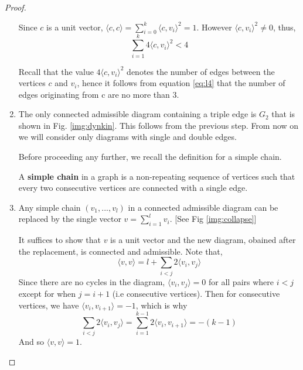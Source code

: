\begin{proof}
\begin{enumerate}
        Since $c$ is a unit vector, $\langle c, c \rangle = \sum_{i=0}^k \langle c, v_i \rangle^2 = 1$. However 
        $\langle c, v_i \rangle^2 \not= 0$, thus,
            \begin{equation}
                \label{eq:l4}
                \sum_{i=1}^k 4\langle c, v_i \rangle^2 < 4
            \end{equation}
            
        Recall that the value $4\langle c, v_i \rangle^2$ denotes the number of edges between the vertices $c$ and $v_i$, hence
        it follows from equation \ref{eq:l4} that the number of edges originating from c are no more than 3.
            
        \item The only connected admissible diagram containing a triple edge is $G_2$ that is shown in Fig. \ref{img:dynkin}.
        This follows from the previous step. From now on we will consider only diagrams with single and double edges.
        
        Before proceeding any further, we recall the definition for a simple chain.
        \begin{definition}
            A \textbf{simple chain} in a graph is a non-repeating sequence of vertices such that every two consecutive vertices are
            connected with a single edge.
        \end{definition}

        \item Any simple chain $(v_1, ..., v_l)$ in a connected admissible diagram can be replaced by the single vector 
        $v = \sum_{i=1}^l v_i$. [See Fig \ref{img:collapse}]

        It suffices to show that $v$ is a unit vector and the new diagram, obained after the replacement, is connected and admissible.
        Note that,
            \begin{equation*}
                \langle v, v \rangle = l + \sum_{i < j} 2 \langle v_i, v_j \rangle
            \end{equation*}
        Since there are no cycles in the diagram, $\langle v_i, v_j \rangle = 0$ for all pairs where $i < j$ except for when $j = i+1$
        (i.e consecutive vertices). Then for consecutive vertices, we have $\langle v_i, v_{i+1} \rangle = -1$, which is why 
        \begin{equation*}
            \sum_{i < j} 2 \langle v_i, v_j \rangle = \sum_{i  = 1}^{k-1} 2 \langle v_i, v_{i+1} \rangle = -(k-1)
        \end{equation*}
        And so $\langle v, v \rangle = 1$.


\end{enumerate}
\end{proof}

